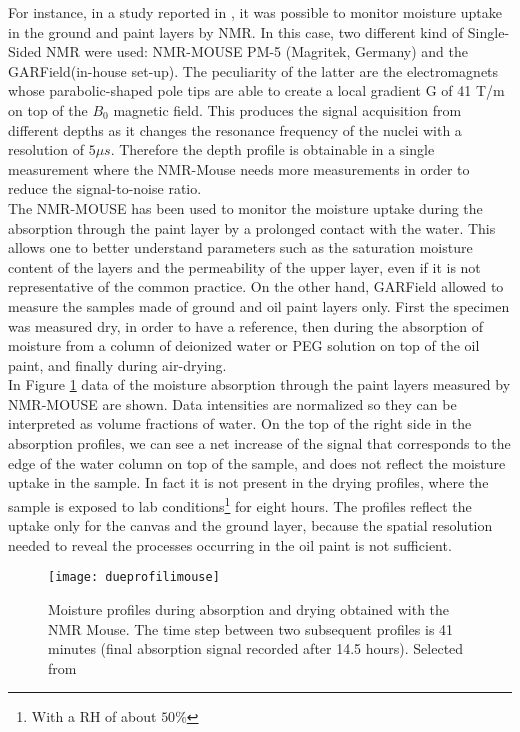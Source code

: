 \documentclass[a4paper,11pt]{report}
\begin{document}
  For instance, in a study reported in \cite{duepaint}, it was possible to monitor moisture uptake in the ground and paint layers by NMR. In this case, two different kind of Single-Sided NMR were used: NMR-MOUSE PM-5 (Magritek, Germany) and the GARField(in-house set-up). The peculiarity of the latter are the electromagnets whose parabolic-shaped pole tips are able to create a local gradient G of 41 T/m on top of the $B_0$ magnetic field\cite{duepaint}. This produces the signal acquisition from different depths as it changes the resonance frequency of the nuclei with a resolution of $5\mu s$. Therefore the depth profile is obtainable in a single measurement where the NMR-Mouse needs more measurements in order to reduce the signal-to-noise ratio\cite{duepaint}.\\
  The NMR-MOUSE has been used to monitor the moisture uptake during the absorption through the paint layer by a prolonged contact with the water. This allows one to better understand parameters such as the saturation moisture content of the layers and the permeability of the upper layer, even if it is not representative of the common practice. On the other hand, GARField allowed to measure the samples made of ground and oil paint layers only. First the specimen was measured dry, in order to have a reference, then during the absorption of moisture from a column of deionized water or PEG solution on top of the oil paint, and finally during air-drying.\\
  In Figure \ref{dueprofilimouse} data of the moisture absorption through the paint layers measured by NMR-MOUSE are shown. Data intensities are normalized so they can be interpreted as volume fractions of water. On the top of the right side in the absorption profiles, we can see a net increase of the signal that corresponds to the edge of the water column on top of the sample, and does not reflect the moisture uptake in the sample. In fact it is not present in the drying profiles, where the sample is exposed to lab conditions\footnote{With a RH of about $50\%$} for eight hours. The profiles reflect the uptake only for the canvas and the ground layer, because the spatial resolution needed to reveal the processes occurring in the oil paint is not sufficient.
  
  \begin{figure}[h]
  	\centering
  	\texttt{[image: dueprofilimouse]}	
  	\caption{Moisture profiles during absorption and drying obtained with the NMR Mouse. The time step between two subsequent profiles is 41 minutes (final absorption signal recorded after 14.5 hours). Selected from \cite{duepaint}}\label{dueprofilimouse}
  \end{figure}
  
\end{document}
